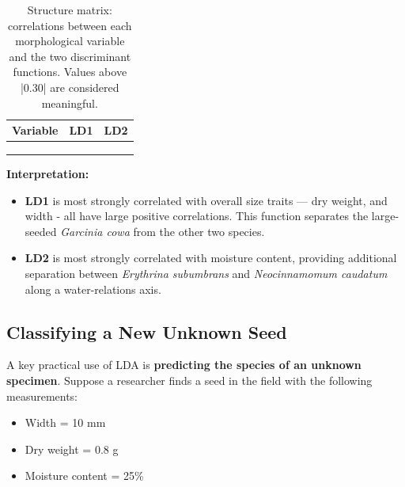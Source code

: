 \documentclass[
]{book}
\providecommand{\tightlist}{%
  \setlength{\itemsep}{0pt}\setlength{\parskip}{0pt}}
\begin{document}
\begin{table}
\centering
\caption{\label{tab:structure-matrix}Structure matrix: correlations between each morphological variable and the two discriminant functions. Values above |0.30| are considered meaningful.}
\centering
\begin{tabu} to 
\hline
Variable & LD1 & LD2\\
\hline
{} &  & \\
\hline
{} &  & \\
\hline
{} &  & \\
\hline
\end{tabu}
\end{table}

\textbf{Interpretation:}

\begin{itemize}
\tightlist
\item
  \textbf{LD1} is most strongly correlated with overall size traits --- dry weight, and width - all have large positive correlations. This function separates the large-seeded \emph{Garcinia cowa} from the other two species.
\item
  \textbf{LD2} is most strongly correlated with moisture content, providing additional separation between \emph{Erythrina subumbrans} and \emph{Neocinnamomum caudatum} along a water-relations axis.
\end{itemize}

\subsection{Classifying a New Unknown Seed}\label{classifying-a-new-unknown-seed}

A key practical use of LDA is \textbf{predicting the species of an unknown specimen}. Suppose a researcher finds a seed in the field with the following measurements:

\begin{itemize}
\tightlist
\item
  Width = 10 mm
\item
  Dry weight = 0.8 g
\item
  Moisture content = 25\%
\end{itemize}
\end{document}
